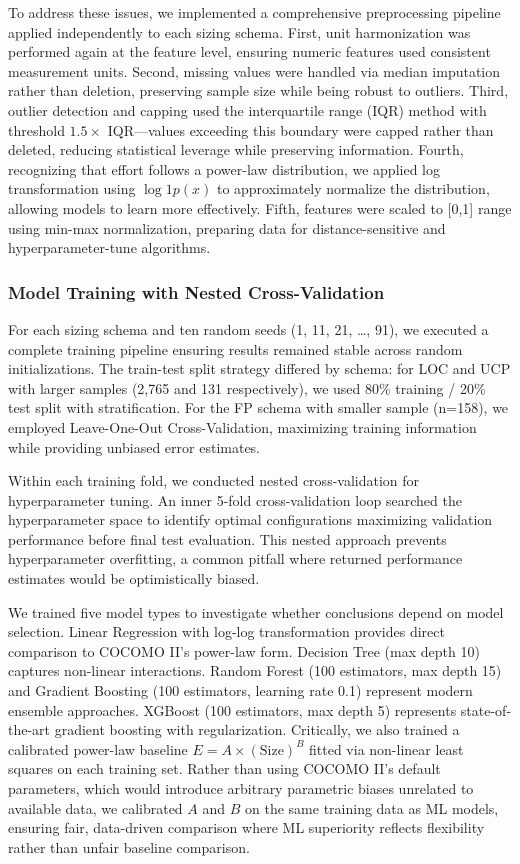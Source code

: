 \documentclass[11pt,a4paper]{article}
\begin{document}
To address these issues, we implemented a comprehensive preprocessing pipeline applied independently to each sizing schema. First, unit harmonization was performed again at the feature level, ensuring numeric features used consistent measurement units. Second, missing values were handled via median imputation rather than deletion, preserving sample size while being robust to outliers. Third, outlier detection and capping used the interquartile range (IQR) method with threshold $1.5 \times$ IQR---values exceeding this boundary were capped rather than deleted, reducing statistical leverage while preserving information. Fourth, recognizing that effort follows a power-law distribution, we applied log transformation using $\log1p(x)$ to approximately normalize the distribution, allowing models to learn more effectively. Fifth, features were scaled to [0,1] range using min-max normalization, preparing data for distance-sensitive and hyperparameter-tune algorithms.

\subsubsection{Model Training with Nested Cross-Validation}

For each sizing schema and ten random seeds (1, 11, 21, \ldots, 91), we executed a complete training pipeline ensuring results remained stable across random initializations. The train-test split strategy differed by schema: for LOC and UCP with larger samples (2,765 and 131 respectively), we used 80\% training / 20\% test split with stratification. For the FP schema with smaller sample (n=158), we employed Leave-One-Out Cross-Validation, maximizing training information while providing unbiased error estimates.

Within each training fold, we conducted nested cross-validation for hyperparameter tuning. An inner 5-fold cross-validation loop searched the hyperparameter space to identify optimal configurations maximizing validation performance before final test evaluation. This nested approach prevents hyperparameter overfitting, a common pitfall where returned performance estimates would be optimistically biased.

We trained five model types to investigate whether conclusions depend on model selection. Linear Regression with log-log transformation provides direct comparison to COCOMO II's power-law form. Decision Tree (max depth 10) captures non-linear interactions. Random Forest (100 estimators, max depth 15) and Gradient Boosting (100 estimators, learning rate 0.1) represent modern ensemble approaches. XGBoost (100 estimators, max depth 5) represents state-of-the-art gradient boosting with regularization. Critically, we also trained a calibrated power-law baseline $E = A \times (\text{Size})^B$ fitted via non-linear least squares on each training set. Rather than using COCOMO II's default parameters, which would introduce arbitrary parametric biases unrelated to available data, we calibrated $A$ and $B$ on the same training data as ML models, ensuring fair, data-driven comparison where ML superiority reflects flexibility rather than unfair baseline comparison.
\end{document}
